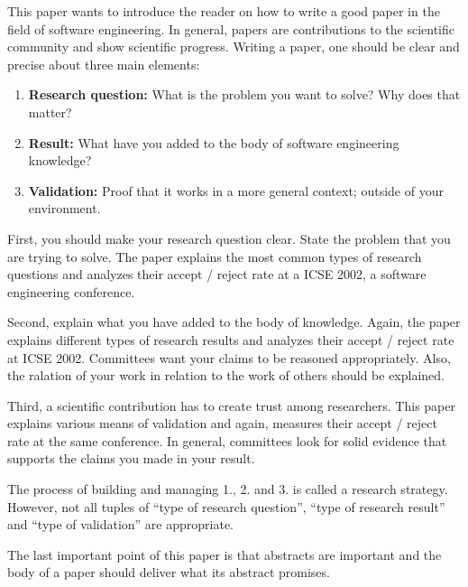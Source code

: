 \documentclass[a4paper,12pt,english]{scrartcl}
\begin{document}
This paper wants to introduce the reader on how to write a good paper in the field of software engineering.
In general, papers are contributions to the scientific community and show scientific progress.
Writing a paper, one should be clear and precise about three main elements:

\begin{enumerate}
	\item \textbf{Research question:} What is the problem you want to solve? Why does that matter?
	\item \textbf{Result:} What have you added to the body of software engineering knowledge?
	\item \textbf{Validation:} Proof that it works in a more general context; outside of your environment.
\end{enumerate}

First, you should make your research question clear.
State the problem that you are trying to solve.
The paper explains the most common types of research questions and analyzes their accept / reject rate at a ICSE 2002, a software engineering conference.

Second, explain what you have added to the body of knowledge.
Again, the paper explains different types of research results and analyzes their accept / reject rate at ICSE 2002.
Committees want your claims to be reasoned appropriately.
Also, the ralation of your work in relation to the work of others should be explained.

Third, a scientific contribution has to create trust among researchers.
This paper explains various means of validation and again, measures their accept / reject rate at the same conference.
In general, committees look for solid evidence that supports the claims you made in your result.

The process of building and managing 1., 2. and 3. is called a research strategy.
However, not all tuples of \enquote{type of research question}, \enquote{type of research result} and \enquote{type of validation} are appropriate.

The last important point of this paper is that abstracts are important and the body of a paper should deliver what its abstract promises.
\end{document}
